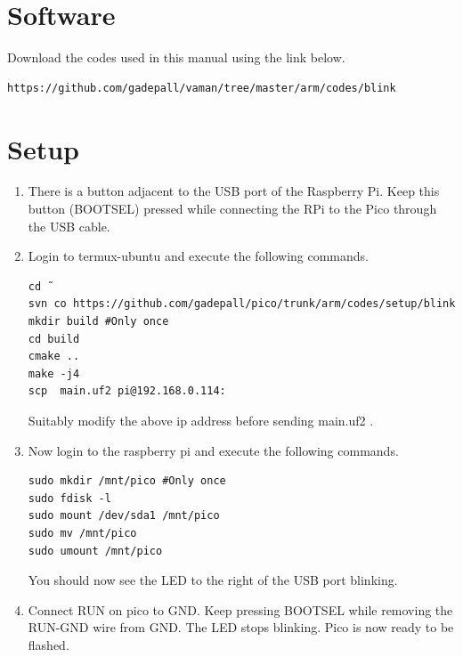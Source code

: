 \documentclass[journal,12pt,twocolumn]{IEEEtran}
\renewcommand\thesection{\arabic{section}}
\begin{document}
\section{Software}
%
Download the codes used in this manual using the link below.
\begin{lstlisting}
https://github.com/gadepall/vaman/tree/master/arm/codes/blink
\end{lstlisting}


\section{Setup}
\renewcommand{\theequation}{\theenumi}
\renewcommand{\thefigure}{\theenumi}
\begin{enumerate}[label=\thesection.\arabic*.,ref=\thesection.\theenumi]

\item  There is a button adjacent to the USB port of the Raspberry Pi.  
Keep this button (BOOTSEL) pressed while connecting the 
RPi to the Pico through the USB cable.
\item Login to termux-ubuntu and execute the following commands.
\begin{lstlisting}
cd ˜
svn co https://github.com/gadepall/pico/trunk/arm/codes/setup/blink
mkdir build #Only once
cd build
cmake ..
make -j4
scp  main.uf2 pi@192.168.0.114:
\end{lstlisting}
Suitably modify the above ip address before sending main.uf2 .
\item Now login to the raspberry pi and execute the following commands.
\begin{lstlisting}
sudo mkdir /mnt/pico #Only once
sudo fdisk -l
sudo mount /dev/sda1 /mnt/pico
sudo mv /mnt/pico
sudo umount /mnt/pico
\end{lstlisting}
You should now see the LED to the right of the USB port blinking.
\item Connect RUN on pico to GND.  Keep pressing BOOTSEL while removing
the RUN-GND wire from GND.  The LED stops blinking.  Pico is now ready to be flashed.
\end{enumerate}
%
\end{document}
